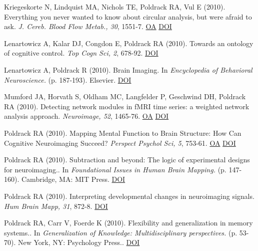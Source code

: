 Kriegeskorte N, Lindquist MA, Nichols TE, Poldrack RA, Vul E (2010). Everything you never wanted to know about circular analysis, but were afraid to ask. \textit{J. Cereb. Blood Flow Metab., 30}, 1551-7. \href{https://www.ncbi.nlm.nih.gov/pmc/articles/PMC2949251}{OA} \href{http://dx.doi.org/10.1038/jcbfm.2010.86}{DOI} \vspace{2mm}

Lenartowicz A, Kalar DJ, Congdon E, Poldrack RA (2010). Towards an ontology of cognitive control. \textit{Top Cogn Sci, 2}, 678-92. \href{http://dx.doi.org/10.1111/j.1756-8765.2010.01100.x}{DOI} \vspace{2mm}

Lenartowicz A, Poldrack R (2010). Brain Imaging. In \textit{Encyclopedia of Behavioral Neuroscience.} (p. 187-193). Elsevier. \href{http://dx.doi.org/10.1016/b978-0-08-045396-5.00052-x}{DOI} \vspace{2mm}

Mumford JA, Horvath S, Oldham MC, Langfelder P, Geschwind DH, Poldrack RA (2010). Detecting network modules in fMRI time series: a weighted network analysis approach. \textit{Neuroimage, 52}, 1465-76. \href{https://www.ncbi.nlm.nih.gov/pmc/articles/PMC3632300}{OA} \href{http://dx.doi.org/10.1016/j.neuroimage.2010.05.047}{DOI} \vspace{2mm}

Poldrack RA (2010). Mapping Mental Function to Brain Structure: How Can Cognitive Neuroimaging Succeed? \textit{Perspect Psychol Sci, 5}, 753-61. \href{https://www.ncbi.nlm.nih.gov/pmc/articles/PMC4112478}{OA} \href{http://dx.doi.org/10.1177/1745691610388777}{DOI} \vspace{2mm}

Poldrack RA (2010). Subtraction and beyond: The logic of experimental designs for neuroimaging.. In \textit{Foundational Issues in Human Brain Mapping.} (p. 147-160). Cambridge, MA: MIT Press. \href{http://dx.doi.org/10.7551/mitpress/9780262014021.001.0001}{DOI} \vspace{2mm}

Poldrack RA (2010). Interpreting developmental changes in neuroimaging signals. \textit{Hum Brain Mapp, 31}, 872-8. \href{http://dx.doi.org/10.1002/hbm.21039}{DOI} \vspace{2mm}

Poldrack RA, Carr V, Foerde K (2010). Flexibility and generalization in memory systems.. In \textit{Generalization of Knowledge: Multidisciplinary perspectives.} (p. 53-70). New York, NY: Psychology Press.. \href{http://dx.doi.org/9781136945465}{DOI} \vspace{2mm}

